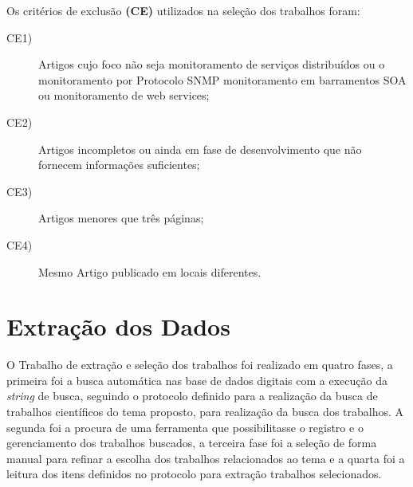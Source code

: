 Os critérios de exclusão \textbf{(CE)} utilizados na seleção dos trabalhos foram:

\begin{description}
\item[CE1)]Artigos cujo foco não seja monitoramento de serviços distribuídos ou o monitoramento por Protocolo SNMP monitoramento em barramentos SOA ou monitoramento de web services;
\item[CE2)] Artigos incompletos ou ainda em fase de desenvolvimento que não fornecem informações suficientes;
\item[CE3)] Artigos menores que três páginas;
\item[CE4)] Mesmo Artigo publicado em locais diferentes.
\end{description}


\section{Extração dos Dados}
O Trabalho de extração e seleção dos trabalhos foi realizado em quatro fases, a primeira foi a busca automática nas base de dados digitais com a execução da \textit{string} de busca, seguindo o protocolo definido para a realização da busca de trabalhos científicos do tema proposto, para realização da busca dos trabalhos. A segunda foi a procura de uma ferramenta que possibilitasse o registro e o gerenciamento dos trabalhos buscados, a terceira fase foi a seleção de forma manual para refinar a escolha dos trabalhos relacionados ao tema e a quarta foi a leitura dos itens definidos no protocolo para extração trabalhos selecionados.

